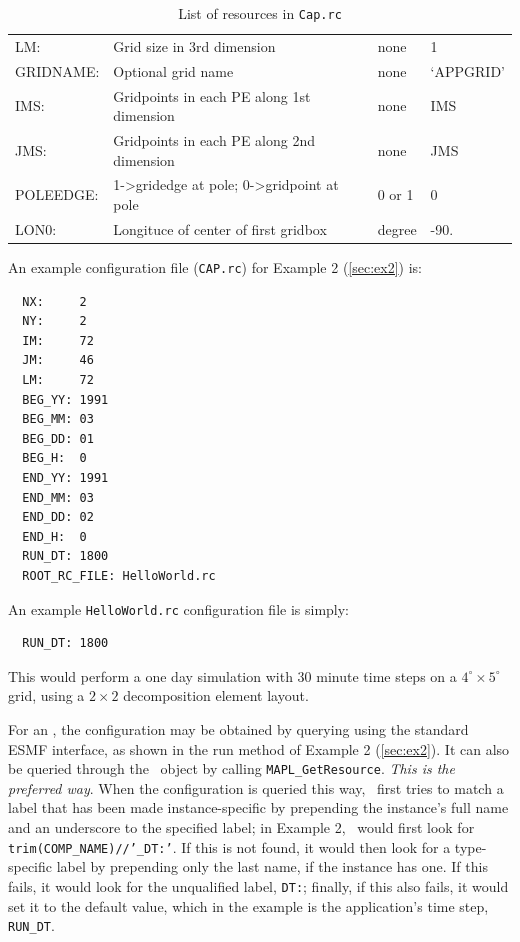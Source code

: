 \begin{table}[!h]
{\begin{tabular}{p{.95in} p{3in} p{0.8in} p{1.5in}}
  LM:          & Grid size in 3rd dimension             & none    & 1\\
  GRIDNAME:    & Optional grid name                     & none    & `APPGRID'\\
  IMS:         & Gridpoints in each PE along 1st dimension & none & IMS\\
  JMS:         & Gridpoints in each PE along 2nd dimension & none & JMS\\
  POLEEDGE:    & 1->gridedge at pole; 0->gridpoint at pole & 0 or 1 & 0\\
  LON0:        & Longituce of center of first gridbox   & degree  & -90.\\
\end{tabular}
}
\caption{List of resources in \texttt{Cap.rc}}
\label{tab:capResources}
\end{table}

\newpage
An example configuration file ({\tt CAP.rc}) for Example 2 (\ref{sec:ex2}) is:
\footnotesize
\begin{verbatim}
  NX:     2
  NY:     2
  IM:     72
  JM:     46
  LM:     72
  BEG_YY: 1991
  BEG_MM: 03
  BEG_DD: 01
  BEG_H:  0
  END_YY: 1991
  END_MM: 03
  END_DD: 02
  END_H:  0
  RUN_DT: 1800
  ROOT_RC_FILE: HelloWorld.rc
\end{verbatim}
\normalsize

An example {\tt HelloWorld.rc} configuration file is simply:
\footnotesize
\begin{verbatim}
  RUN_DT: 1800
\end{verbatim}
\normalsize
%
This would perform a one day simulation with 30 minute time steps
on a $4^{\circ} \times 5^{\circ}$ grid, using a $2 \times 2$
decomposition element layout.

For an \egc, the configuration may be obtained by querying
using the standard ESMF interface, as shown in the run method
of Example 2 (\ref{sec:ex2}).
It can also be queried through the \ggn\  object by calling
{\tt MAPL\_GetResource}. \emph{This is the preferred way}.
When the configuration is
queried this way, \ggn\ first tries to match a label that has been made
instance-specific by prepending the instance's full name and an underscore
to the specified label; in Example 2, \ggn\  would first look for
{\tt trim(COMP\_NAME)//'\_DT:'}. If this is not found, it would then look for
a type-specific label by prepending only the last name, if the
instance has one. If this fails, it would look for the
unqualified label, {\tt DT:}; finally, if this also fails, it would
set it to the default value, which in the example is the application's
time step, {\tt RUN\_DT}.



